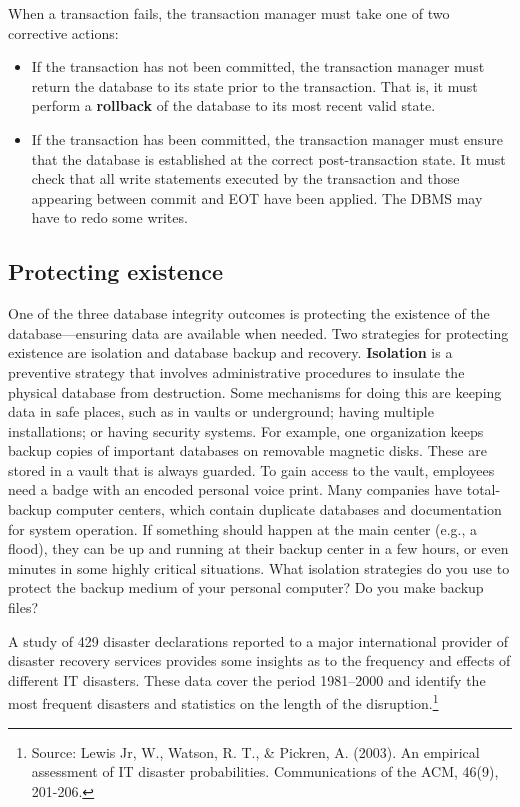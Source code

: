 \documentclass[
]{article}
\begin{document}
When a transaction fails, the transaction manager must take one of two
corrective actions:

\begin{itemize}
\item
  If the transaction has not been committed, the transaction manager
  must return the database to its state prior to the transaction. That
  is, it must perform a \textbf{rollback} of the database to its most
  recent valid state.
\item
  If the transaction has been committed, the transaction manager must
  ensure that the database is established at the correct
  post-transaction state. It must check that all write statements
  executed by the transaction and those appearing between commit and
  EOT have been applied. The DBMS may have to redo some writes.
\end{itemize}

\hypertarget{protecting-existence}{%
\subsection*{Protecting existence}\label{protecting-existence}}

One of the three database integrity outcomes is protecting the existence
of the database---ensuring data are available when needed. Two
strategies for protecting existence are isolation and database backup
and recovery. \textbf{Isolation} is a preventive strategy that involves
administrative procedures to insulate the physical database from
destruction. Some mechanisms for doing this are keeping data in safe
places, such as in vaults or underground; having multiple installations;
or having security systems. For example, one organization keeps backup
copies of important databases on removable magnetic disks. These are
stored in a vault that is always guarded. To gain access to the vault,
employees need a badge with an encoded personal voice print. Many
companies have total-backup computer centers, which contain duplicate
databases and documentation for system operation. If something should
happen at the main center (e.g., a flood), they can be up and running at
their backup center in a few hours, or even minutes in some highly
critical situations. What isolation strategies do you use to protect the
backup medium of your personal computer? Do you make backup files?

A study of 429 disaster declarations reported to a major international
provider of disaster recovery services provides some insights as to the
frequency and effects of different IT disasters. These data cover the
period 1981--2000 and identify the most frequent disasters and
statistics on the length of the disruption.\footnote{Source: Lewis Jr, W., Watson, R. T., \& Pickren, A. (2003). An
  empirical assessment of IT disaster probabilities. Communications of
  the ACM, 46(9), 201-206.}
\end{document}
